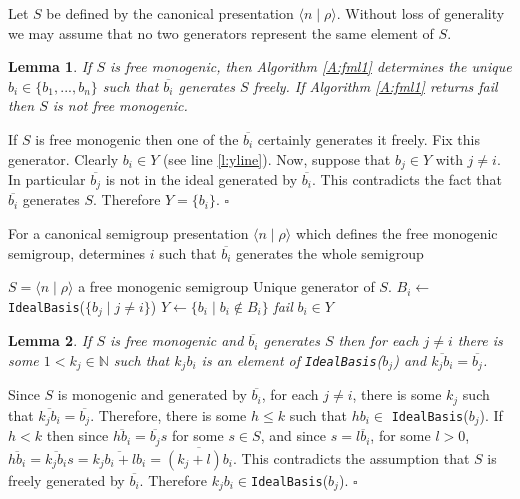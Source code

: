 \documentclass[12pt]{article}
\newtheorem{lemma}{\bf Lemma}
\newenvironment{proof}{{\it Proof.\/}}{$\square$\\}
\begin{document}
Let $S$ be defined by the canonical presentation 
$\langle n \mid \rho \rangle$. Without loss of 
generality we may assume that no two generators 
represent the same element of $S$.

\begin{lemma}
If $S$ is free monogenic, then Algorithm \ref{A:fml1} determines
the unique $b_i\in\{b_1, ..., b_n\}$ such that $\overline{b_i}$ generates 
$S$ freely. If Algorithm \ref{A:fml1} returns \emph{fail} then
$S$ is not free monogenic.
\end{lemma}

\begin{proof}
If $S$ is free monogenic then
one of the $\overline{b_i}$ certainly generates it freely. Fix this generator.
Clearly $b_i\in Y$ (see line \ref{l:yline}). Now, suppose that $b_j\in Y$
with $j\neq i$. In particular $\overline{b_j}$ is not in the ideal generated
by $\overline{b_i}$. This contradicts the fact that $\overline{b_i}$ generates
$S$. Therefore $Y=\{b_i\}$. 
\end{proof}

\begin{algorithm}
\caption{For a canonical semigroup presentation $\langle n \mid \rho \rangle$ 
which defines the free monogenic semigroup, determines $i$ such that
$\overline{b_i}$ generates the whole semigroup}
\label{A:fml1}
\begin{algorithmic}[1]
\REQUIRE $S = \langle n \mid \rho \rangle$  a free monogenic semigroup
\ENSURE Unique generator of $S$.
        \STATE $B_i\leftarrow$ {\tt IdealBasis}($\{b_j \mid j \neq i\}$)
\ENDFOR
\STATE $Y\leftarrow \{b_i\mid b_i\notin B_i\}$ \label{l:yline}
 \emph{fail}
\ELSE 
{} $b_i\in Y$
\ENDIF
\end{algorithmic}
\end{algorithm}

\begin{lemma}\label{l:freegen}
If $S$ is free monogenic and $\overline{b_i}$ generates $S$ then for each
$j \neq i$ there is some $1 < k_j \in \mathbb{N}$
such that $k_j b_i$ is  an element of {\tt IdealBasis}($b_j$)
and $\overline{k_jb_i} = \overline{b_j}$.
\end{lemma}

\begin{proof}
Since $S$ is monogenic and generated by $\overline{b_i}$, for
each $j \neq i$, there is some $k_j$ such 
that $\overline{k_j b_i} = \overline{b_j}$. Therefore, there is some
$h \leq k$ such that $h b_i \in $ {\tt IdealBasis}($b_j$). 
If $h < k$ then since $\overline{hb_i}  = \overline{b_j} s$ 
for some $s \in S$, and since $s = \overline{lb_i}$, for some $l>0$,
$\overline{hb_i} = \overline{k_jb_i}s = \overline{k_jb_i + lb_i}
= \overline{(k_j + l)b_i}$. This contradicts the assumption that $S$ is  
freely generated by $\overline{b_i}$. 
Therefore $k_jb_i \in ${\tt IdealBasis}($b_j$).
\end{proof}
\end{document}
